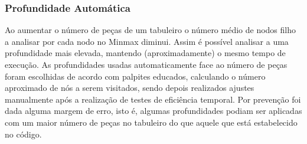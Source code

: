 \subsubsection{Profundidade Automática}

Ao aumentar o número de peças de um tabuleiro o número médio de nodos filho a analisar por cada nodo no Minmax diminui. Assim é possível analisar a uma profundidade mais elevada,  mantendo (aproximadamente) o mesmo tempo de execução. As profundidades usadas automaticamente face ao número de peças foram escolhidas de acordo com palpites educados, calculando o número aproximado de nós a serem visitados, sendo depois realizados ajustes manualmente após a realização de testes de eficiência temporal. Por prevenção foi dada alguma margem de erro, isto é, algumas profundidades podiam ser aplicadas com um maior número de peças no tabuleiro do que aquele que está estabelecido no código.